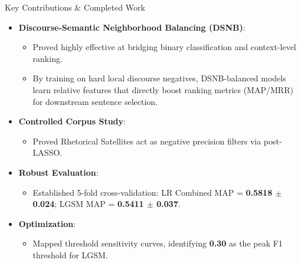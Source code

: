 \documentclass[aspectratio=169]{beamer}
\begin{document}
\begin{frame}{Key Contributions \& Completed Work}
    \begin{itemize}
        \item \textbf{Discourse-Semantic Neighborhood Balancing (DSNB)}:
            \begin{itemize}
                \item Proved highly effective at bridging binary classification and context-level ranking.
                \item By training on hard local discourse negatives, DSNB-balanced models learn relative features that directly boost ranking metrics (MAP/MRR) for downstream sentence selection.
            \end{itemize}
        \vspace{0.15cm}
        \item \textbf{Controlled Corpus Study}:
            \begin{itemize}
                \item Proved Rhetorical Satellites act as negative precision filters via post-LASSO.
            \end{itemize}
        \vspace{0.15cm}
        \item \textbf{Robust Evaluation}:
            \begin{itemize}
                \item Established 5-fold cross-validation: LR Combined MAP = \textbf{0.5818 $\pm$ 0.024}; LGSM MAP = \textbf{0.5411 $\pm$ 0.037}.
            \end{itemize}
        \vspace{0.15cm}
        \item \textbf{Optimization}:
            \begin{itemize}
                \item Mapped threshold sensitivity curves, identifying \textbf{0.30} as the peak F1 threshold for LGSM.
            \end{itemize}
    \end{itemize}
\end{frame}
\end{document}
